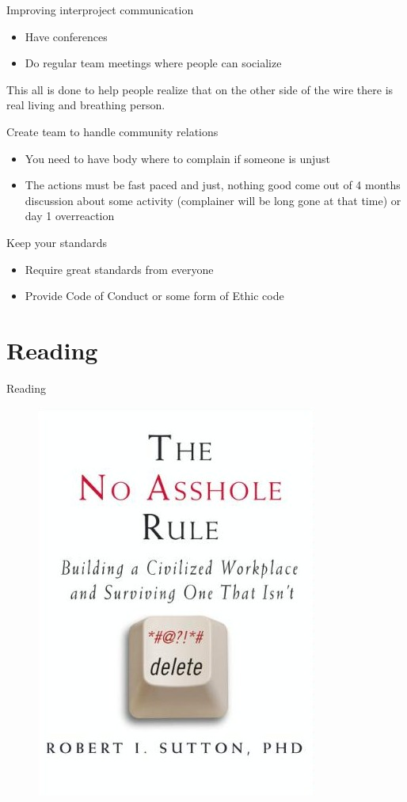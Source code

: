 \documentclass{beamer}
\begin{document}
\begin{frame}[t]{Improving interproject communication}
	\begin{itemize}
	\item Have conferences
	\item Do regular team meetings where people can socialize
	\end{itemize}
	\vspace{0.8cm}
	\begin{center}
	This all is done to help people realize that on the other side of the wire there is real living and breathing person.
	\end{center}
\end{frame}

\begin{frame}[t]{Create team to handle community relations}
	\begin{itemize}
	\item You need to have body where to complain if someone is unjust
	\item The actions must be fast paced and just, nothing good come out of 4 months discussion about some activity (complainer will be long gone at that time) or day 1 overreaction
	\end{itemize}
\end{frame}

\begin{frame}[t]{Keep your standards}
	\begin{itemize}
	\item Require great standards from everyone
	\item Provide Code of Conduct or some form of Ethic code
	\end{itemize}
\end{frame}

\section{Reading}

\begin{frame}{Reading}
	\begin{figure}
	\includegraphics[width= 0.4\linewidth]{The_No_Asshole_Rule.jpg}
	\end{figure}
\end{frame}
\end{document}
